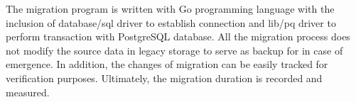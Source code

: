 The migration program is written with Go programming language with the inclusion of database/sql driver to establish connection and lib/pq driver to perform transaction with PostgreSQL database. All the migration process does not modify the source data in legacy storage to serve as backup for in case of emergence. In addition, the changes of migration can be easily tracked for verification purposes. Ultimately, the migration duration is recorded and measured.  


